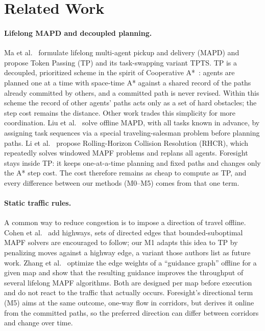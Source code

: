 
\section{Related Work}
\label{sec:related}

\paragraph{Lifelong MAPD and decoupled planning.}
Ma et al.~\cite{ma2017lifelong} formulate lifelong multi-agent pickup and
delivery (MAPD) and propose Token Passing (TP) and its task-swapping variant
TPTS. TP is a decoupled, prioritized scheme in the spirit of Cooperative
A*~\cite{silver2005cooperative}: agents are planned one at a time with
space-time A* against a shared record of the paths already committed by
others, and a committed path is never revised. Within this scheme the record
of other agents' paths acts only as a set of hard obstacles; the step cost
remains the distance. Other work trades this simplicity for more coordination.
Liu et al.~\cite{liu2019task} solve offline MAPD, with all tasks known in
advance, by assigning task sequences via a special traveling-salesman problem
before planning paths. Li et al.~\cite{li2021lifelong} propose Rolling-Horizon
Collision Resolution (RHCR), which repeatedly solves windowed MAPF problems and
replans all agents. Foresight stays inside TP: it keeps one-at-a-time planning
and fixed paths and changes only the A* step cost. The cost therefore remains
as cheap to compute as TP, and every difference between our methods (M0--M5)
comes from that one term.

\paragraph{Static traffic rules.}
A common way to reduce congestion is to impose a direction of travel offline.
Cohen et al.~\cite{cohen2015feasibility} add highways, sets of directed edges
that bounded-suboptimal MAPF solvers are encouraged to follow; our M1 adapts
this idea to TP by penalizing moves against a highway edge, a variant those
authors list as future work. Zhang et al.~\cite{zhang2024guidance} optimize the
edge weights of a ``guidance graph'' offline for a given map and show that the
resulting guidance improves the throughput of several lifelong MAPF
algorithms. Both are designed per map before execution and do not react to the
traffic that actually occurs. Foresight's directional term (M5) aims at the same
outcome, one-way flow in corridors, but derives it online from the committed
paths, so the preferred direction can differ between corridors and change over
time.

